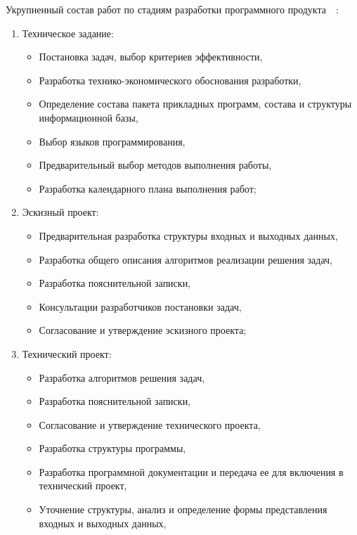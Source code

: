     Укрупненный состав работ по стадиям разработки программного продукта~\cite{gost_34601}~\cite{economic_sajin}:
    \begin{enumerate}
        \item Техническое задание:
            \begin{itemize}
                \item Постановка задач, выбор критериев эффективности,
                \item Разработка технико-экономического обоснования разработки,
                \item Определение состава пакета прикладных программ, состава и структуры информационной базы,
                \item Выбор языков программирования,
                \item Предварительный выбор методов выполнения работы,
                \item Разработка календарного плана выполнения работ;
            \end{itemize}
        \item Эскизный проект:
            \begin{itemize}
                \item Предварительная разработка структуры входных и выходных данных,
                \item Разработка общего описания алгоритмов реализации решения задач,
                \item Разработка пояснительной записки,
                \item Консультации разработчиков постановки задач,
                \item Согласование и утверждение эскизного проекта;
            \end{itemize}
        \item Технический проект:
            \begin{itemize}
                \item Разработка алгоритмов решения задач,
                \item Разработка пояснительной записки,
                \item Согласование и утверждение технического проекта,
                \item Разработка структуры программы,
                \item Разработка программной документации и передача ее для включения в технический проект,
                \item Уточнение структуры, анализ и определение формы представления входных и выходных данных,

\end{itemize}
\end{enumerate}
